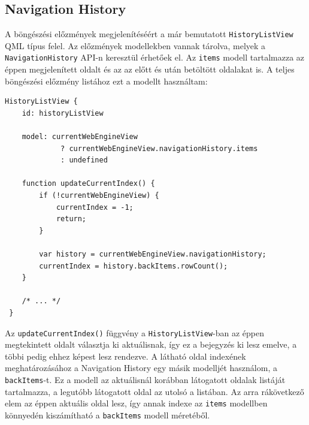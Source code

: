 \documentclass[12pt]{report}
\begin{document}
\subsection{Navigation History}
A böngészési előzmények megjelenítéséért a már bemutatott \texttt{HistoryListView}
QML típus felel. Az előzmények modellekben vannak tárolva, melyek a
\texttt{NavigationHistory} API-n keresztül érhetőek el. Az \texttt{items} modell tartalmazza
az éppen megjelenített oldalt és az az előtt és után betöltött oldalakat is.
A teljes böngészési előzmény listához ezt a modellt használtam:
\begin{lstlisting}[title=main.qml]
 HistoryListView {
    id: historyListView

    model: currentWebEngineView
             ? currentWebEngineView.navigationHistory.items
             : undefined

    function updateCurrentIndex() {
        if (!currentWebEngineView) {
            currentIndex = -1;
            return;
        }

        var history = currentWebEngineView.navigationHistory;
        currentIndex = history.backItems.rowCount();
    }

    /* ... */
 }
\end{lstlisting}
Az \texttt{updateCurrentIndex()} függvény a \texttt{HistoryListView}-ban az éppen megtekintett
oldalt választja ki aktuálisnak, így ez a bejegyzés ki lesz emelve, a többi pedig ehhez
képest lesz rendezve. A látható oldal indexének meghatározásához a Navigation History egy
másik modelljét használom, a \texttt{backItems}-t. Ez a modell az aktuálisnál korábban
látogatott oldalak listáját tartalmazza, a legutóbb látogatott oldal az utolsó a listában.
Az arra rákövetkező elem az éppen aktuális oldal lesz, így annak indexe az \texttt{items}
modellben könnyedén kiszámítható a \texttt{backItems} modell méretéből.
\end{document}
